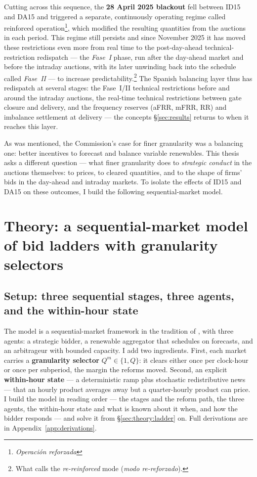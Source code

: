 \documentclass[11pt,a4paper]{article}
\theoremstyle{definition}
\theoremstyle{remark}
\theoremstyle{plain}
\begin{document}
Cutting across this sequence, the \textbf{28 April 2025 blackout} fell between ID15 and DA15 and triggered a separate, continuously operating regime called reinforced operation\footnote{\textit{Operación reforzada}}, which modified the resulting quantities from the auctions in each period. This regime still persists and since November 2025 it has moved these restrictions even more from real time to the post-day-ahead technical-restriction redispatch --- the \emph{Fase~I} phase, run after the day-ahead market and before the intraday auctions, with its later unwinding back into the schedule called \emph{Fase~II} --- to increase predictability.\footnote{What \citet{neurodate_2025} calls the \emph{re-reinforced} mode (\textit{modo re-reforzado}).} The Spanish balancing layer thus has redispatch at several stages: the Fase~I/II technical restrictions before and around the intraday auctions, the real-time technical restrictions between gate closure and delivery, and the frequency reserves (aFRR, mFRR, RR) and imbalance settlement at delivery --- the concepts \S\ref{sec:results} returns to when it reaches this layer.

As was mentioned, the Commission's case for finer granularity was a balancing one: better incentives to forecast and balance variable renewables. This thesis asks a different question --- what finer granularity does to \emph{strategic conduct} in the auctions themselves: to prices, to cleared quantities, and to the shape of firms' bids in the day-ahead and intraday markets. To isolate the effects of ID15 and DA15 on these outcomes, I build the following sequential-market model.

\section{Theory: a sequential-market model of bid ladders with granularity selectors}\label{sec:theory}

\subsection{Setup: three sequential stages, three agents, and the within-hour state}\label{sec:theory:setup}

The model is a sequential-market framework in the tradition of \citet{ito_reguant_2016}, with three agents: a strategic bidder, a renewable aggregator that schedules on forecasts, and an arbitrageur with bounded capacity. I add two ingredients. First, each market carries a \textbf{granularity selector} $Q^m \in \{1, Q\}$: it clears either once per clock-hour or once per subperiod, the margin the reforms moved. Second, an explicit \textbf{within-hour state} --- a deterministic ramp plus stochastic redistributive news --- that an hourly product averages away but a quarter-hourly product can price. I build the model in reading order --- the stages and the reform path, the three agents, the within-hour state and what is known about it when, and how the bidder responds --- and solve it from \S\ref{sec:theory:ladder} on. Full derivations are in Appendix~\ref{app:derivations}.
\end{document}
